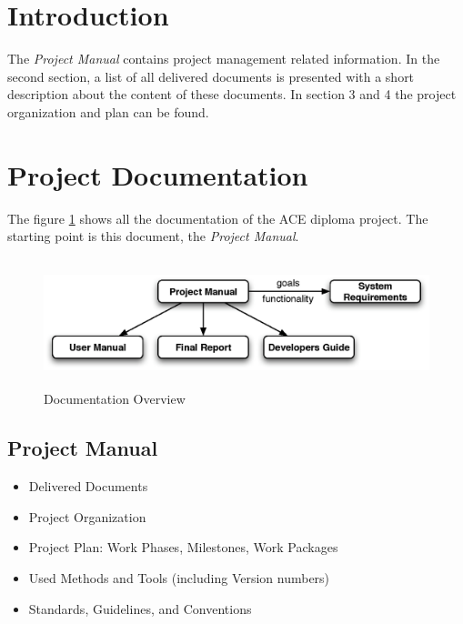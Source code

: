 \documentclass[11pt,a4paper]{article}
\begin{document}
\setlength{\parindent}{0pt}



\tableofcontents

\newpage


\section{Introduction}
The \emph{Project Manual} contains project management related information.
In the second section, a list of all delivered documents is presented with
a short description about the content of these documents. In section 3 and
4 the project organization and plan can be found.


\section{Project Documentation}
The figure \ref{fig:documentation overview} shows all the documentation of
the ACE diploma project. The starting point is this document, the 
\emph{Project Manual}.

\begin{figure}[H]
 \centering
 \includegraphics[width=15cm,height=3.73cm]{../images/projectmanagement/documents.eps}
 \caption{Documentation Overview}
 \label{fig:documentation overview}
\end{figure}

\subsection{Project Manual}
\begin{itemize}
 \item Delivered Documents
 \item Project Organization
 \item Project Plan: Work Phases, Milestones, Work Packages
 \item Used Methods and Tools (including Version numbers)
 \item Standards, Guidelines, and Conventions
\end{itemize}
\end{document}
